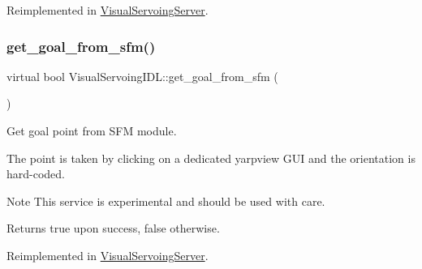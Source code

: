Reimplemented in \hyperlink{classVisualServoingServer_a542e0a6bf6158563a601740363911474}{Visual\+Servoing\+Server}.

\mbox{\label{classVisualServoingIDL_aff8af7d3ebe68f5fbfa7197eb7115723}} 
\subsubsection{\texorpdfstring{get\+\_\+goal\+\_\+from\+\_\+sfm()}{get\_goal\_from\_sfm()}}
{\footnotesize\ttfamily virtual bool Visual\+Servoing\+I\+D\+L\+::get\+\_\+goal\+\_\+from\+\_\+sfm (\begin{DoxyParamCaption}{ }\end{DoxyParamCaption})\hspace{0.3cm}{\ttfamily [virtual]}}



Get goal point from S\+FM module. 

The point is taken by clicking on a dedicated \textquotesingle{}yarpview\textquotesingle{} G\+UI and the orientation is hard-\/coded. \begin{DoxyNote}{Note}
This service is experimental and should be used with care. 
\end{DoxyNote}
\begin{DoxyReturn}{Returns}
true upon success, false otherwise. 
\end{DoxyReturn}


Reimplemented in \hyperlink{classVisualServoingServer_a3b0e5078c2f32493a2ef31ea32450d80}{Visual\+Servoing\+Server}.

\mbox{\label{classVisualServoingIDL_afb359486a7e42bfda3ddf66a2e518e90}} 
